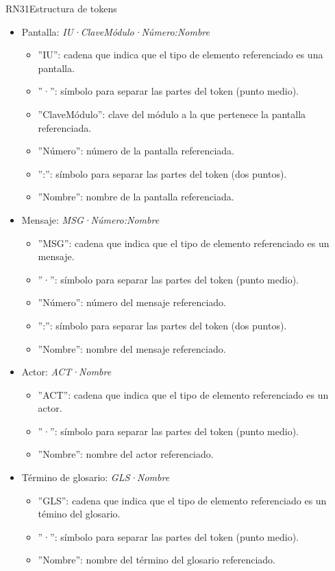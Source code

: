\begin{BussinesRule}{RN31}{Estructura de tokens}
\begin{itemize}
\begin{itemize}
		\end{itemize}
		\item Pantalla: {\em IU·ClaveMódulo·Número:Nombre}
		\begin{itemize}
			\item ''IU'': cadena que indica que el tipo de elemento referenciado es una pantalla.
			\item ''·'': símbolo para separar las partes del token (punto medio).
			\item ''ClaveMódulo'': clave del módulo a la que pertenece la pantalla referenciada.
			\item ''Número'': número de la pantalla referenciada.
			\item '':'': símbolo para separar las partes del token (dos puntos).
			\item ''Nombre'': nombre de la pantalla referenciada.
		\end{itemize}
		\item Mensaje: {\em MSG·Número:Nombre}
		\begin{itemize}
			\item ''MSG'': cadena que indica que el tipo de elemento referenciado es un mensaje.
			\item ''·'':  símbolo para separar las partes del token (punto medio).
			\item ''Número'': número del mensaje referenciado.
			\item '':'': símbolo para separar las partes del token (dos puntos).
			\item ''Nombre'': nombre del mensaje referenciado.
		\end{itemize}
	\item Actor: {\em ACT·Nombre}
		\begin{itemize}
			\item ''ACT'': cadena que indica que el tipo de elemento referenciado es un actor.
			\item ''·'':  símbolo para separar las partes del token (punto medio).
			\item ''Nombre'': nombre del actor referenciado.
		\end{itemize}
	\item Término de glosario: {\em GLS·Nombre}
		\begin{itemize}
			\item ''GLS'': cadena que indica que el tipo de elemento referenciado es un témino del glosario.
			\item ''·'':  símbolo para separar las partes del token (punto medio).
			\item ''Nombre'': nombre del término del glosario referenciado.

\end{itemize}
\end{itemize}
\end{BussinesRule}
